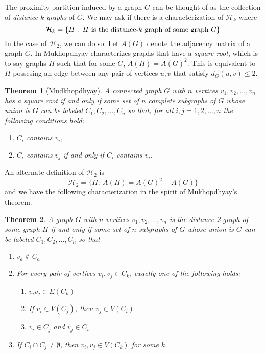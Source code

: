 \documentclass[12pt]{article}
\newtheorem{theorem}{Theorem}
\newcommand{\bthm}[1]{\begin{theorem}#1\end{theorem}}
\theoremstyle{definition}
\begin{document}
The proximity partition induced by a graph $G$ can be thought of as the collection of \textit{distance-$k$ graphs} of $G$.  We may ask if there is a characterization of $\mathcal{H}_k$ where
\[\mathcal{H}_k = \{H :\: H \makebox{ is the distance-$k$ graph of some graph } G\}\]
In the case of $\mathcal{H}_2$, we can do so.  Let $A(G)$ denote the adjacency matrix of a graph $G$.  In \cite{sqrtofgraph} Mukhopdhyay characterizes graphs that have a \textit{square root}, which is to say graphs $H$ such that for some $G$, $A(H) = A(G)^2$.  This is equivalent to $H$ possesing an edge between any pair of vertices $u,v$ that satisfy $d_G(u,v) \leq 2$.  
\bthm{[Mudkhopdhyay] A connected graph $G$ with $n$ vertices $v_1, v_2, \ldots, v_n$ has a square root if and only if some set of $n$ complete subgraphs of $G$ whose union is $G$ can be labeled $C_1, C_2, \ldots, C_n$ so that, for all $i,j = 1, 2, \ldots, n$ the following conditions hold:
\begin{enumerate}
	\item $C_i$ contains $v_i$,
	\item $C_i$ contains $v_j$ if and only if $C_i$ contains $v_i$.
\end{enumerate}}
\noindent An alternate definition of $\mathcal{H}_2$ is 
\[\mathcal{H}_2 = \{H : \: A(H) = A(G)^2-A(G)\}\] and we have the following characterization in the spirit of Mukhopdhyay's theorem.  
\bthm{A graph $G$ with $n$ vertices $v_1, v_2, \ldots , v_n$ is the distance 2 graph of some graph $H$ if and only if some set of $n$ subgraphs of $G$ whose union is $G$ can be labeled $C_1, C_2, \ldots, C_n$ so that 
\begin{enumerate}
	\item $v_a \notin C_a$ 
	\item For every pair of vertices $v_i, v_j \in C_k$, exactly one of the following holds:
	\begin{enumerate}
		\item $v_iv_j \in E(C_k)$ 
		\item If $v_i \in V(C_j)$, then $v_j \in V(C_i)$
		\item $v_i \in C_j$ and $v_j \in C_i$
	\end{enumerate}
	\item If $C_i \cap C_j \neq \emptyset$, then $v_i, v_j \in V(C_k)$ for some $k$.
\end{enumerate}}
\end{document}
